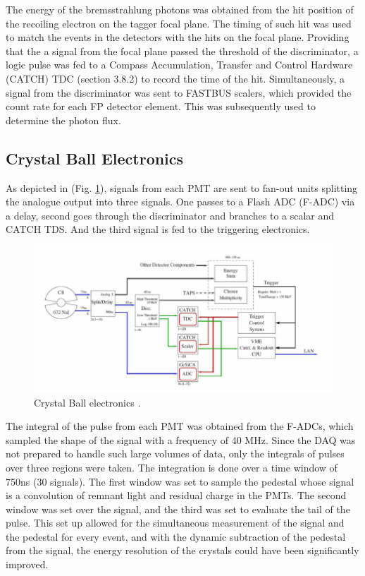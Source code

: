 \indent The energy of the bremsstrahlung photons was obtained from the hit position of the recoiling electron on the tagger focal plane. The timing of such hit was used to match the events in the detectors with the hits on the focal plane. Providing that the a signal from the focal plane passed the threshold of the discriminator, a logic pulse was fed to a Compass Accumulation, Transfer and Control Hardware (CATCH) TDC (section 3.8.2) to record the time of the hit. Simultaneously, a signal from the discriminator was sent to FASTBUS scalers, which provided the count rate for each FP detector element. This was subsequently used to determine the photon flux.

\subsection{Crystal Ball Electronics}

\indent As depicted in (Fig. \ref{cbelectronics}), signals from each PMT are sent to fan-out units splitting the analogue output into three signals. One passes to a Flash ADC (F-ADC) via a delay, second goes through the discriminator and branches to a scalar and CATCH TDS. And the third signal is fed to the triggering electronics.

\begin{figure}[H]
\begin{center}
\includegraphics[scale=1.0]{cbelectronics.png}
\caption{Crystal Ball electronics \cite{krambrich}.}
\label{cbelectronics}
\end{center}
\end{figure}

\indent The integral of the pulse from each PMT was obtained from the F-ADCs, which sampled the shape of the signal with a frequency of 40 MHz. Since the DAQ was not prepared to handle such large volumes of data, only the integrals of pulses over three regions were taken. The integration is done over a time window of 750ns (30 signals). The first window was set to sample the pedestal whose signal is a convolution of remnant light and residual charge in the PMTs. The second window was set over the signal, and the third was set to evaluate the tail of the pulse. This set up allowed for the simultaneous measurement of the signal and the pedestal for every event, and with the dynamic subtraction of the pedestal from the signal, the energy resolution of the crystals could have been significantly improved.


